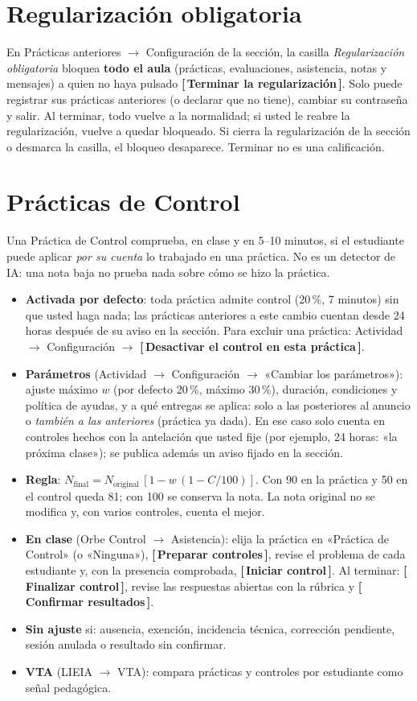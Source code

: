 \documentclass[11pt,a4paper,oneside]{book}
\newcommand{\boton}[1]{\textsf{\textbf{[\,#1\,]}}}
\begin{document}
\section{Regularización obligatoria}
En Prácticas anteriores $\rightarrow$ Configuración de la sección, la casilla \emph{Regularización obligatoria} bloquea
\textbf{todo el aula} (prácticas, evaluaciones, asistencia, notas y mensajes) a quien no haya pulsado
\boton{Terminar la regularización}. Solo puede registrar sus prácticas anteriores (o declarar que no tiene), cambiar su
contraseña y salir. Al terminar, todo vuelve a la normalidad; si usted le reabre la regularización, vuelve a quedar
bloqueado. Si cierra la regularización de la sección o desmarca la casilla, el bloqueo desaparece. Terminar no es una
calificación.

\section{Prácticas de Control}
Una Práctica de Control comprueba, en clase y en 5--10 minutos, si el estudiante puede aplicar \emph{por su cuenta} lo
trabajado en una práctica. No es un detector de IA: una nota baja no prueba nada sobre cómo se hizo la práctica.
\begin{itemize}
  \item \textbf{Activada por defecto}: toda práctica admite control (20\,\%, 7 minutos) sin que usted haga nada; las
        prácticas anteriores a este cambio cuentan desde 24 horas después de su aviso en la sección. Para excluir una
        práctica: Actividad $\rightarrow$ Configuración $\rightarrow$ \boton{Desactivar el control en esta práctica}.
  \item \textbf{Parámetros} (Actividad $\rightarrow$ Configuración $\rightarrow$ «Cambiar los parámetros»): ajuste
        máximo $w$ (por defecto 20\,\%, máximo 30\,\%), duración, condiciones y política de ayudas, y a qué entregas se
        aplica: solo a las posteriores al anuncio o \emph{también a las anteriores} (práctica ya dada). En ese caso solo
        cuenta en controles hechos con la antelación que usted fije (por ejemplo, 24 horas: «la próxima clase»); se
        publica además un aviso fijado en la sección.
  \item \textbf{Regla}: $N_\text{final} = N_\text{original}\,[1 - w\,(1 - C/100)]$. Con 90 en la práctica y 50 en el control
        queda 81; con 100 se conserva la nota. La nota original no se modifica y, con varios controles, cuenta el mejor.
  \item \textbf{En clase} (Orbe Control $\rightarrow$ Asistencia): elija la práctica en «Práctica de Control» (o «Ninguna»),
        \boton{Preparar controles}, revise el problema de cada estudiante y, con la presencia comprobada, \boton{Iniciar control}.
        Al terminar: \boton{Finalizar control}, revise las respuestas abiertas con la rúbrica y \boton{Confirmar resultados}.
  \item \textbf{Sin ajuste} si: ausencia, exención, incidencia técnica, corrección pendiente, sesión anulada o resultado sin confirmar.
  \item \textbf{VTA} (LIEIA $\rightarrow$ VTA): compara prácticas y controles por estudiante como señal pedagógica.
\end{itemize}
\end{document}
